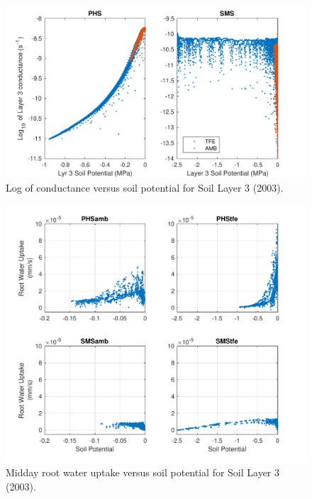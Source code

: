 \documentclass[draft,linenumbers]{agujournal}
\begin{document}
  \begin{figure}[h]
     \centering
     \includegraphics[width=30pc]{../figs2/suppfig2.pdf}
     \caption{Log of conductance versus soil potential for Soil Layer 3 (2003).}
     \label{supp:cond2}
  \end{figure}
  \clearpage
  
    \begin{figure}[h]
     \centering
     \includegraphics[width=30pc]{../figs3/supprwu.pdf}
     \caption{Midday root water uptake versus soil potential for Soil Layer 3 (2003).}
     \label{supp:rwu}
  \end{figure}
  \clearpage
\end{document}
